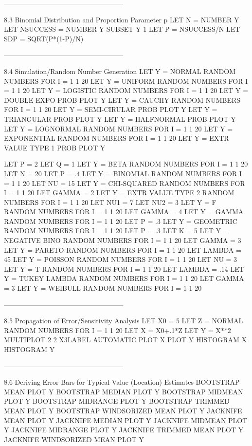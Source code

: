 -----------------------------------------------------
 
8.3
Binomial Distribution and Proportion Parameter p
      LET N = NUMBER Y
      LET NSUCCESS = NUMBER Y SUBSET Y 1
      LET P = NSUCCESS/N
      LET SDP = SQRT(P*(1-P)/N)
 
-----------------------------------------------------
 
8.4
Simulation/Random Number Generation
       LET Y = NORMAL RANDOM NUMBERS FOR I = 1 1 20
       LET Y = UNIFORM RANDOM NUMBERS FOR I = 1 1 20
       LET Y = LOGISTIC RANDOM NUMBERS FOR I = 1 1 20
       LET Y = DOUBLE EXPO PROB PLOT Y
       LET Y = CAUCHY RANDOM NUMBERS FOR I = 1 1 20
       LET Y = SEMI-CIRULAR PROB PLOT Y
       LET Y = TRIANGULAR PROB PLOT Y
       LET Y = HALFNORMAL PROB PLOT Y
       LET Y = LOGNORMAL RANDOM NUMBERS FOR I = 1 1 20
       LET Y = EXPONENTIAL RANDOM NUMBERS FOR I = 1 1 20
       LET Y = EXTR VALUE TYPE 1 PROB PLOT Y
 
       LET P = 2
       LET Q = 1
       LET Y = BETA RANDOM NUMBERS FOR I = 1 1 20
       LET N = 20
       LET P = .4
       LET Y = BINOMIAL RANDOM NUMBERS FOR I = 1 1 20
       LET NU = 15
       LET Y = CHI-SQUARED RANDOM NUMBERS FOR I = 1 1 20
       LET GAMMA = 2
       LET Y = EXTR VALUE TYPE 2 RANDOM NUMBERS FOR I = 1 1 20
       LET NU1 = 7
       LET NU2 = 3
       LET Y = F RANDOM NUMBERS FOR I = 1 1 20
       LET GAMMA = 4
       LET Y = GAMMA RANDOM NUMBERS FOR I = 1 1 20
       LET P = .3
       LET Y = GEOMETRIC RANDOM NUMBERS FOR I = 1 1 20
       LET P = .3
       LET K = 5
       LET Y = NEGATIVE BINO RANDOM NUMBERS FOR I = 1 1 20
       LET GAMMA = 3
       LET Y = PARETO RANDOM NUMBERS FOR I = 1 1 20
       LET LAMBDA = 45
       LET Y = POISSON RANDOM NUMBERS FOR I = 1 1 20
       LET NU = 3
       LET Y = T RANDOM NUMBERS FOR I = 1 1 20
       LET LAMBDA = .14
       LET Y = TUKEY LAMBDA RANDOM NUMBERS FOR I = 1 1 20
       LET GAMMA = 3
       LET Y = WEIBULL RANDOM NUMBERS FOR I = 1 1 20
 
-----------------------------------------------------
 
8.5
Propagation of Error/Sensitivity Analysis
      LET X0 = 5
      LET Z = NORMAL RANDOM NUMBERS FOR I = 1 1 20
      LET X = X0+.1*Z
      LET Y = X**2
      MULTIPLOT 2 2
      X3LABEL AUTOMATIC
      PLOT X
      PLOT Y
      HISTOGRAM X
      HISTOGRAM Y
 
-----------------------------------------------------
 
8.6
Deriving Error Bars for Typical Value (Location) Estimates
      BOOTSTRAP MEAN PLOT Y
      BOOTSTRAP MEDIAN PLOT Y
      BOOTSTRAP MIDMEAN PLOT Y
      BOOTSTRAP MIDRANGE PLOT Y
      BOOTSTRAP TRIMMED MEAN PLOT Y
      BOOTSTRAP WINDSORIZED MEAN PLOT Y
      JACKNIFE  MEAN PLOT Y
      JACKNIFE  MEDIAN PLOT Y
      JACKNIFE  MIDMEAN PLOT Y
      JACKNIFE  MIDRANGE PLOT Y
      JACKNIFE  TRIMMED MEAN PLOT Y
      JACKNIFE  WINDSORIZED MEAN PLOT Y
 
